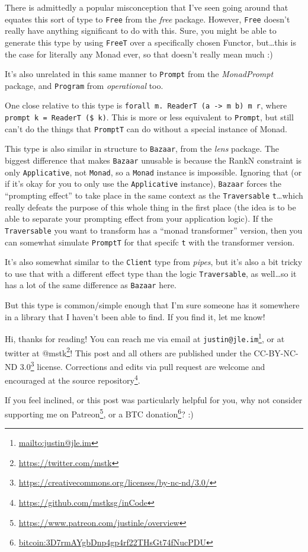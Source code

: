 \documentclass[]{article}
\renewcommand{\href}[2]{#2\footnote{\url{#1}}}
\begin{document}
There is admittedly a popular misconception that I've seen going around that
equates this sort of type to \texttt{Free} from the \emph{free} package.
However, \texttt{Free} doesn't really have anything significant to do with this.
Sure, you might be able to generate this type by using \texttt{FreeT} over a
specifically chosen Functor, but\ldots{}this is the case for literally any Monad
ever, so that doesn't really mean much :)

It's also unrelated in this same manner to \texttt{Prompt} from the
\emph{MonadPrompt} package, and \texttt{Program} from \emph{operational} too.

One close relative to this type is
\texttt{forall\ m.\ ReaderT\ (a\ -\textgreater{}\ m\ b)\ m\ r}, where
\texttt{prompt\ k\ =\ ReaderT\ (\$\ k)}. This is more or less equivalent to
\texttt{Prompt}, but still can't do the things that \texttt{PromptT} can do
without a special instance of Monad.

This type is also similar in structure to \texttt{Bazaar}, from the \emph{lens}
package. The biggest difference that makes \texttt{Bazaar} unusable is because
the RankN constraint is only \texttt{Applicative}, not \texttt{Monad}, so a
\texttt{Monad} instance is impossible. Ignoring that (or if it's okay for you to
only use the \texttt{Applicative} instance), \texttt{Bazaar} forces the
``prompting effect'' to take place in the same context as the
\texttt{Traversable} \texttt{t}\ldots{}which really defeats the purpose of this
whole thing in the first place (the idea is to be able to separate your
prompting effect from your application logic). If the \texttt{Traversable} you
want to transform has a ``monad transformer'' version, then you can somewhat
simulate \texttt{PromptT} for that specifc \texttt{t} with the transformer
version.

It's also somewhat similar to the \texttt{Client} type from \emph{pipes}, but
it's also a bit tricky to use that with a different effect type than the logic
\texttt{Traversable}, as well\ldots{}so it has a lot of the same difference as
\texttt{Bazaar} here.

But this type is common/simple enough that I'm sure someone has it somewhere in
a library that I haven't been able to find. If you find it, let me know!

Hi, thanks for reading! You can reach me via email at
\href{mailto:justin@jle.im}{\nolinkurl{justin@jle.im}}, or at twitter at
\href{https://twitter.com/mstk}{@mstk}! This post and all others are published
under the \href{https://creativecommons.org/licenses/by-nc-nd/3.0/}{CC-BY-NC-ND
3.0} license. Corrections and edits via pull request are welcome and encouraged
at \href{https://github.com/mstksg/inCode}{the source repository}.

If you feel inclined, or this post was particularly helpful for you, why not
consider \href{https://www.patreon.com/justinle/overview}{supporting me on
Patreon}, or a \href{bitcoin:3D7rmAYgbDnp4gp4rf22THsGt74fNucPDU}{BTC donation}?
:)
\end{document}
